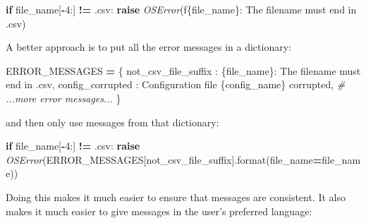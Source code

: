 \documentclass[
]{krantz}
\makeatletter
\newenvironment{Shaded}{\begin{snugshade}}{\end{snugshade}}
\newcommand{\BuiltInTok}[1]{#1}
\newcommand{\CommentTok}[1]{\textcolor[rgb]{0.56,0.35,0.01}{\textit{#1}}}
\newcommand{\ControlFlowTok}[1]{\textcolor[rgb]{0.13,0.29,0.53}{\textbf{#1}}}
\newcommand{\DecValTok}[1]{\textcolor[rgb]{0.00,0.00,0.81}{#1}}
\newcommand{\NormalTok}[1]{#1}
\newcommand{\OperatorTok}[1]{\textcolor[rgb]{0.81,0.36,0.00}{\textbf{#1}}}
\newcommand{\PreprocessorTok}[1]{\textcolor[rgb]{0.56,0.35,0.01}{\textit{#1}}}
\newcommand{\SpecialCharTok}[1]{\textcolor[rgb]{0.00,0.00,0.00}{#1}}
\newcommand{\SpecialStringTok}[1]{\textcolor[rgb]{0.31,0.60,0.02}{#1}}
\newcommand{\StringTok}[1]{\textcolor[rgb]{0.31,0.60,0.02}{#1}}
\newenvironment{kframe}{%
\medskip{}
\setlength{\fboxsep}{.8em}
 \def\at@end@of@kframe{}%
 \ifinner\ifhmode%
  \def\at@end@of@kframe{\end{minipage}}%
  \begin{minipage}{\columnwidth}%
 \fi\fi%
 \def\FrameCommand##1{\hskip\@totalleftmargin \hskip-\fboxsep
 \colorbox{shadecolor}{##1}\hskip-\fboxsep
     \hskip-\linewidth \hskip-\@totalleftmargin \hskip\columnwidth}%
 \MakeFramed {\advance\hsize-\width
   \@totalleftmargin\z@ \linewidth\hsize
   \@setminipage}}%
 {\par\unskip\endMakeFramed%
 \at@end@of@kframe}
\renewenvironment{Shaded}{\begin{kframe}}{\end{kframe}}
\makeatother
\begin{document}
\begin{Shaded}
\begin{Highlighting}[]
\ControlFlowTok{if}\NormalTok{ file\_name[}\OperatorTok{{-}}\DecValTok{4}\NormalTok{:] }\OperatorTok{!=} \StringTok{\textquotesingle{}.csv\textquotesingle{}}\NormalTok{:}
    \ControlFlowTok{raise} \PreprocessorTok{OSError}\NormalTok{(}\SpecialStringTok{f\textquotesingle{}}\SpecialCharTok{\{}\NormalTok{file\_name}\SpecialCharTok{\}}\SpecialStringTok{: The filename must end in \textasciigrave{}.csv\textasciigrave{}\textquotesingle{}}\NormalTok{)}
\end{Highlighting}
\end{Shaded}

A better approach is to put all the error messages in a dictionary:

\begin{Shaded}
\begin{Highlighting}[]
\NormalTok{ERROR\_MESSAGES }\OperatorTok{=}\NormalTok{ \{}
    \StringTok{\textquotesingle{}not\_csv\_file\_suffix\textquotesingle{}}\NormalTok{ : }\StringTok{\textquotesingle{}}\SpecialCharTok{\{file\_name\}}\StringTok{: The filename must end in \textasciigrave{}.csv\textasciigrave{}\textquotesingle{}}\NormalTok{,}
    \StringTok{\textquotesingle{}config\_corrupted\textquotesingle{}}\NormalTok{ : }\StringTok{\textquotesingle{}Configuration file }\SpecialCharTok{\{config\_name\}}\StringTok{ corrupted\textquotesingle{}}\NormalTok{,}
    \CommentTok{\# ...more error messages...}
\NormalTok{\}}
\end{Highlighting}
\end{Shaded}

and then only use messages from that dictionary:

\begin{Shaded}
\begin{Highlighting}[]
\ControlFlowTok{if}\NormalTok{ file\_name[}\OperatorTok{{-}}\DecValTok{4}\NormalTok{:] }\OperatorTok{!=} \StringTok{\textquotesingle{}.csv\textquotesingle{}}\NormalTok{:}
    \ControlFlowTok{raise} \PreprocessorTok{OSError}\NormalTok{(ERROR\_MESSAGES[}\StringTok{\textquotesingle{}not\_csv\_file\_suffix\textquotesingle{}}\NormalTok{].}\BuiltInTok{format}\NormalTok{(file\_name}\OperatorTok{=}\NormalTok{file\_name))}
\end{Highlighting}
\end{Shaded}

Doing this makes it much easier to ensure that messages are consistent.
It also makes it much easier to give messages in the user's preferred language:
\end{document}
